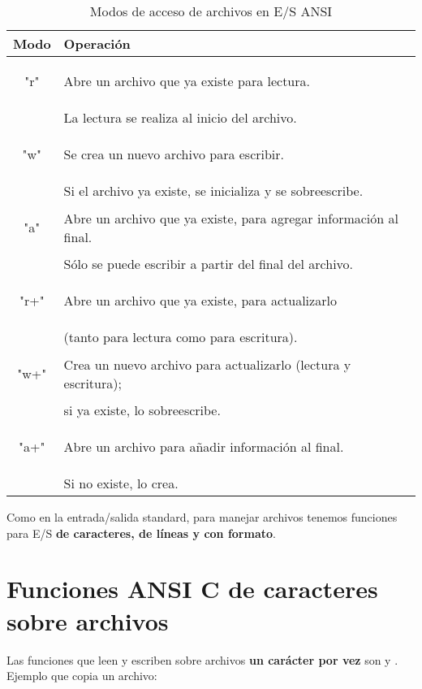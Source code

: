 \begin{table}[hbtp]
\centering
\begin{tabular}{c|l}
Modo & Operación \\
\hline
\begin{codecell}
"r"
\end{codecell} & Abre un archivo que ya existe para lectura. \\
				& La lectura se realiza al inicio del archivo.\\
\hline
\begin{codecell}
"w"
\end{codecell} & Se crea un nuevo archivo para escribir. \\
				& Si el archivo ya existe, se inicializa y se sobreescribe.\\
\hline
\begin{codecell}
"a" 
\end{codecell}& Abre un archivo que ya existe, para agregar información al final.\\ 
				& Sólo se puede escribir a partir del final del archivo.\\
\hline
\begin{codecell}
"r+"
\end{codecell}& Abre un archivo que ya existe, para actualizarlo \\
				& (tanto para lectura como para escritura).\\
\hline
\begin{codecell}
"w+"
\end{codecell}& Crea un nuevo archivo para actualizarlo (lectura y escritura); \\
				& si ya existe, lo sobreescribe.\\
\hline
\begin{codecell}
"a+"
\end{codecell}& Abre un archivo para añadir información al final. \\
				& Si no existe, lo crea.\\
\end{tabular}
\caption{Modos de acceso de archivos en E/S ANSI}
\label{tab:modos}
\end{table}

Como en la entrada/salida standard, para manejar archivos tenemos funciones
para E/S \textbf{de caracteres, de líneas y con formato}.

\section{Funciones ANSI C de caracteres sobre archivos}
\label{subsubsec:esarchivosansiccaract}
Las funciones que leen y escriben sobre archivos \textbf{un carácter por vez} son  y . Ejemplo que copia un archivo:

